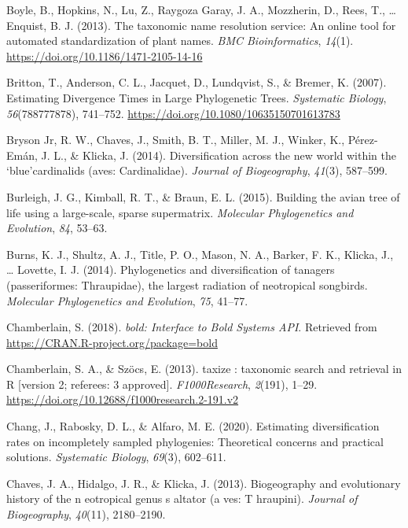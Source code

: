 \documentclass[english,man]{apa6}
\begin{document}
\leavevmode\hypertarget{ref-Boyle2013}{}%
Boyle, B., Hopkins, N., Lu, Z., Raygoza Garay, J. A., Mozzherin, D., Rees, T., \ldots{} Enquist, B. J. (2013). The taxonomic name resolution service: An online tool for automated standardization of plant names. \emph{BMC Bioinformatics}, \emph{14}(1). \url{https://doi.org/10.1186/1471-2105-14-16}

\leavevmode\hypertarget{ref-Britton2007}{}%
Britton, T., Anderson, C. L., Jacquet, D., Lundqvist, S., \& Bremer, K. (2007). Estimating Divergence Times in Large Phylogenetic Trees. \emph{Systematic Biology}, \emph{56}(788777878), 741--752. \url{https://doi.org/10.1080/10635150701613783}

\leavevmode\hypertarget{ref-bryson2014diversification}{}%
Bryson Jr, R. W., Chaves, J., Smith, B. T., Miller, M. J., Winker, K., Pérez-Emán, J. L., \& Klicka, J. (2014). Diversification across the new world within the `blue'cardinalids (aves: Cardinalidae). \emph{Journal of Biogeography}, \emph{41}(3), 587--599.

\leavevmode\hypertarget{ref-burleigh2015building}{}%
Burleigh, J. G., Kimball, R. T., \& Braun, E. L. (2015). Building the avian tree of life using a large-scale, sparse supermatrix. \emph{Molecular Phylogenetics and Evolution}, \emph{84}, 53--63.

\leavevmode\hypertarget{ref-burns2014phylogenetics}{}%
Burns, K. J., Shultz, A. J., Title, P. O., Mason, N. A., Barker, F. K., Klicka, J., \ldots{} Lovette, I. J. (2014). Phylogenetics and diversification of tanagers (passeriformes: Thraupidae), the largest radiation of neotropical songbirds. \emph{Molecular Phylogenetics and Evolution}, \emph{75}, 41--77.

\leavevmode\hypertarget{ref-Chamberlain2018}{}%
Chamberlain, S. (2018). \emph{bold: Interface to Bold Systems API}. Retrieved from \url{https://CRAN.R-project.org/package=bold}

\leavevmode\hypertarget{ref-Chamberlain2013}{}%
Chamberlain, S. A., \& Szöcs, E. (2013). taxize : taxonomic search and retrieval in R {[}version 2; referees: 3 approved{]}. \emph{F1000Research}, \emph{2}(191), 1--29. \url{https://doi.org/10.12688/f1000research.2-191.v2}

\leavevmode\hypertarget{ref-chang2020estimating}{}%
Chang, J., Rabosky, D. L., \& Alfaro, M. E. (2020). Estimating diversification rates on incompletely sampled phylogenies: Theoretical concerns and practical solutions. \emph{Systematic Biology}, \emph{69}(3), 602--611.

\leavevmode\hypertarget{ref-chaves2013biogeography}{}%
Chaves, J. A., Hidalgo, J. R., \& Klicka, J. (2013). Biogeography and evolutionary history of the n eotropical genus s altator (a ves: T hraupini). \emph{Journal of Biogeography}, \emph{40}(11), 2180--2190.
\end{document}
